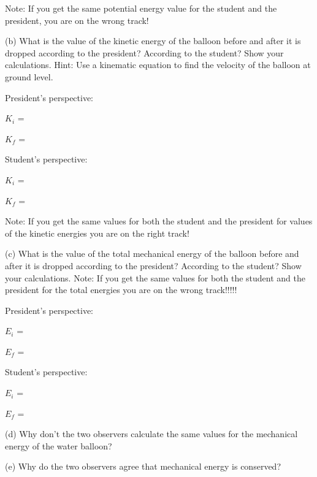 Note: If you get the same potential energy value for the student and the president,
you are on the wrong track!

(b) What is the value of the kinetic energy of the balloon before and after
it is dropped according to the president? According to the student? Show your
calculations. Hint: Use a kinematic equation to find the velocity of the balloon
at ground level.

President's perspective: 
\vspace{5mm}

\( K_{i} \) = 
\vspace{5mm}

\( K_{f} \) =

Student's perspective: 
\vspace{5mm}

\( K_{i} \) = 
\vspace{5mm}

\( K_{f} \) =
\vspace{5mm}

Note: If you get the same values for both the student and the president for
values of the kinetic energies you are on the right track!

(c) What is the value of the total mechanical energy of the balloon before and
after it is dropped according to the president? According to the student? Show
your calculations. Note: If you get the same values for both the student and
the president for the total energies you are on the wrong track!!!!!

President's perspective: 
\vspace{5mm}

\( E_{i} \) = 
\vspace{5mm}

\( E_{f} \) =
\vspace{5mm}

Student's perspective: 
\vspace{5mm}

\( E_{i} \) = 
\vspace{5mm}

\( E_{f} \) =
\vspace{5mm}

(d) Why don't the two observers calculate the same values for the mechanical
energy of the water balloon? 
\answerspace{12mm}

(e) Why do the two observers agree that mechanical energy is conserved? 
\answerspace{12mm}



